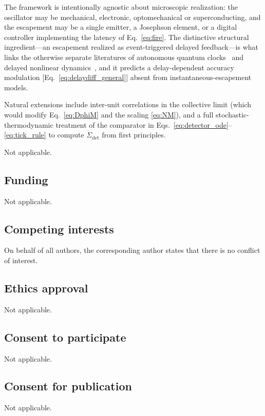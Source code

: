 \documentclass[aps,pre,reprint,amsmath,amssymb,floatfix,nofootinbib]{revtex4-2}
\newcommand{\Sdot}{\dot{\Sigma}}
\begin{document}
The framework is intentionally agnostic about microscopic realization:
the oscillator may be mechanical, electronic, optomechanical or
superconducting, and the escapement may be a single emitter, a Josephson
element, or a digital controller implementing the latency of
Eq.~\eqref{eq:fire}. The distinctive structural ingredient---an
escapement realized as event-triggered delayed feedback---is what links
the otherwise separate literatures of autonomous quantum
clocks~\cite{Erker2017,Brunelli2026} and delayed nonlinear
dynamics~\cite{GiacomelliPoliti1996,YanchukGiacomelli2017}, and it
predicts a delay-dependent accuracy modulation
[Eq.~\eqref{eq:delaydiff_general}] absent from instantaneous-escapement models.

Natural extensions include inter-unit correlations in the collective
limit (which would modify Eq.~\eqref{eq:DphiM} and the scaling
\eqref{eq:NM}), and a full stochastic-thermodynamic treatment of the
comparator in Eqs.~\eqref{eq:detector_ode}--\eqref{eq:tick_rule} to compute $\Sdot_{\mathrm{det}}$
from first principles.

\hypersetup{bookmarksdepth=1}
\backmatter

Not applicable.


\subsection*{Funding}
    Not applicable.

\subsection*{Competing interests}
    On behalf of all authors, the corresponding author states that there is no conflict of interest.

\subsection*{Ethics approval}
    Not applicable.

\subsection*{Consent to participate}
    Not applicable.

\subsection*{Consent for publication}
    Not applicable.
\end{document}
